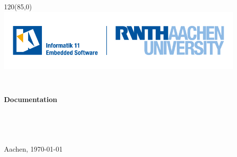 
\newcommand{\thesistypeen}{Documentation}


\renewcommand{\subject}{\thesistypeen\\ }
	

\renewcommand*{\maketitle}{%
  \begin{titlepage}
  	\begin{textblock}{120}(85,0)
  		\includegraphics[height=3.1cm]{i11_Vector_RGB.pdf}
  	\end{textblock}
  	
  	\ 
  	\vspace{0.5cm}

	\centering
	\textbf{\subject}
	
	\vspace{0.8cm}
	\vfill
	
	\textbf{
	  \LARGE{\englishtitle}\\
    }
  
  	\vspace{7.0cm}
  	\vfill
  	
  	\authorname\\
  	
  	\vspace{0.3cm}
  	\vfill
  	
  	Aachen, \today
  	\vspace{0.3cm}
  	\vfill
  	 
  	
  	
    \vspace{0.3cm}
    \vfill
   
  	
   
  \end{titlepage}
}

\maketitle